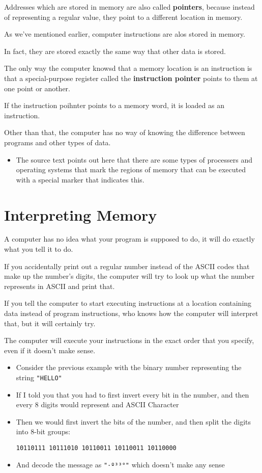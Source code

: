 \documentclass{article}
\newcommand {\code}{\texttt}
\begin{document}
	 Addresses which are stored in memory are also called \textbf {pointers}, because
	 instead of representing a regular value, they point to a different location in 
	 memory.
	 
	 As we've mentioned earlier, computer instructions are alos stored in memory.
	 
	 In fact, they are stored exactly the same way that other data is stored.
	 
	 The only way the computer knowsd that a memory location is an instruction is that a
	 special-purpose register called the \textbf {instruction pointer} points to them
	 at one point or another.
	 
	 If the instruction poihnter points to a memory word, it is loaded as an instruction.
	 
	 Other than that, the computer has no way of knowing the difference between programs
	 and other types of data.
	 \begin {itemize}
	 	\item The source text points out here that there are some types of processers
	 		and operating systems that mark the regions of memory that can be executed
	 		with a special marker that indicates this.
	 \end {itemize}
	 
	 \section {Interpreting Memory}
	 \label {sec:interpreting_memory}
	 
	 A computer has no idea what your program is supposed to do, it will do exactly what
	 you tell it to do.
	 
	 If you accidentally print out a regular number instead of the ASCII codes that make
	 up the number's digits, the computer will try to look up what the number represents
	 in ASCII and print that.
	 
	 If you tell the computer to start executing instructions at a location containing
	 data instead of program instructions, who knows how the computer will interpret
	 that, but it will certainly try.
	 
	 The computer will execute your instructions in the exact order that you specify,
	 even if it doesn't make sense.
	 \begin {itemize}
	 	\item Consider the previous example with the binary number representing the
	 		string \code {"HELLO"}
	 	\item If I told you that you had to first invert every bit in the number,
	 		and then every 8 digits would represent and ASCII Character
	 	\item Then we would first invert the bits of the number, and then split the digits
	 		into 8-bit groups:
	 		\begin {center}
				\code {10110111 10111010 10110011 10110011 10110000}
			\end {center}
		\item And decode the message as \code {"·º³³°"} which doesn't make any sense 
	\end {itemize}
	
\end{document}

